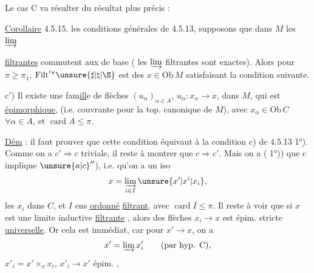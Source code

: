 Le cas C va résulter du résultat plus précis :

\uline{Corollaire} 4.5.15.  les conditions générales de 4.5.13, supposons que dans $M$ les $\varinjlim$

\uline{filtrantes} commutent aux  de base ( les $\varinjlim$ filtrantes sont exactes). Alors pour  $\pi\geq\pi_1$, $\mathrm{Filt}'{}^\pi\unsure{\sharp|\natural|\S}$ est  des $x\in\mathrm{Ob}\,M$ satisfaisant la condition suivante.

c$'$) Il existe une fam\uline{ill}e de flèches $(u_\alpha)_{\alpha\in A}$, $u_\alpha:x_\alpha\longrightarrow x$, dans $M$, qui est \uline{épimorphique}, \uline{ } (i.e. couvrante pour la top. canonique de $M$), avec $x_\alpha\in\mathrm{Ob}\,C$ $\forall\alpha\in A$, et $\operatorname{card}A\leq\pi$.

\uline{Dém} : il faut prouver que cette condition équivaut à la condition c) de 4.5.13 1°). Comme on a $c'\Rightarrow c$ triviale, il reste à montrer que $c\Rightarrow c'$. Mais on a  ( 1°)) que c implique $\unsure{a|c}''$), i.e. qu'on a un iso
\[
x=\varinjlim_{i\in I}\unsure{x'|x^i|x_i},
\]
les $x_i$ dans $C$, et $I$ ens \uline{ordonné} \uline{filtrant}, avec $\operatorname{card}I\leq\pi$. Il reste à voir que si $x$ est  une limite inductive \uline{filtrante} , alors  des flèches $x_i\longrightarrow x$ est épim. stricte \uline{universelle}. Or cela est immédiat, car pour $x'\longrightarrow x$, on a
\[
x'=\varinjlim x'_i\qquad\text{(par hyp. C)},
\]
 $x'_i=x'\times_x x_i$,   $x'_i\longrightarrow x'$  épim. , 

